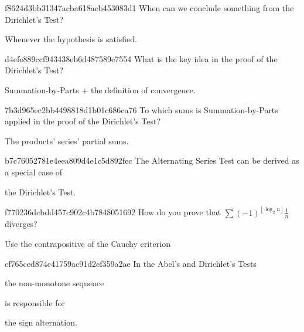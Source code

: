 \begin{note}{f8624d3bb31347acba618aeb453083d1}
    When can we conclude something from the Dirichlet's Test?

    \begin{cloze}{1}
        Whenever the hypothesis is satisfied.
    \end{cloze}
\end{note}

\begin{note}{d4efe889ccf943438eb6d487589e7554}
    What is the key idea in the proof of the Dirichlet's Test?

    \begin{cloze}{1}
        Summation-by-Parts + the definition of convergence.
    \end{cloze}
\end{note}

\begin{note}{7b3d965ec2bb4498818d1b01c686ca76}
    To which sums is Summation-by-Parts applied in the proof of the Dirichlet's Test?

    \begin{cloze}{1}
        The products' series' partial sums.
    \end{cloze}
\end{note}

\begin{note}{b7c76052781e4eea809d4e1c5d892fec}
    The Alternating Series Test can be derived as a special case of \begin{icloze}{1}the Dirichlet's Test.\end{icloze}
\end{note}

\begin{note}{f770236dcbdd457c902c4b7848051692}
    How do you prove that \({ \sum (-1)^{\left\lfloor \log_2 n \right\rfloor}\frac{1}{n} }\) diverges?

    \begin{cloze}{1}
        Use the contrapositive of the Cauchy criterion
    \end{cloze}
\end{note}

\begin{note}{cf765ced874c41759ac91d2ef359a2ae}
    In the Abel's and Dirichlet's Tests \begin{icloze}{2}the non-monotone sequence\end{icloze} is responsible for \begin{icloze}{1}the sign alternation.\end{icloze}
\end{note}

